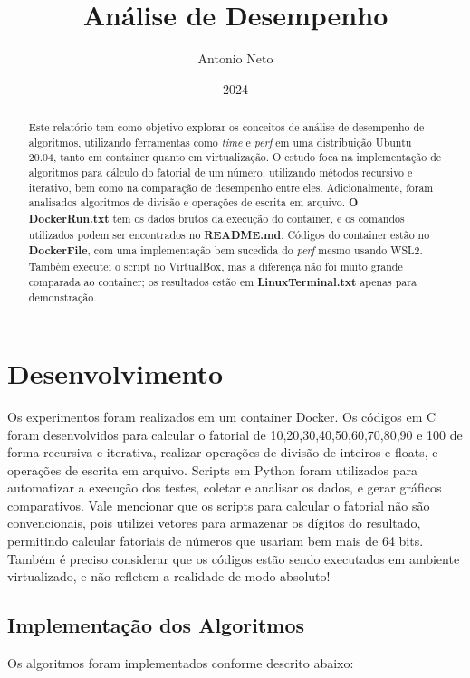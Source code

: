 \documentclass[12pt]{article}
\title{Análise de Desempenho}
\author{Antonio Neto}
\date{2024}
\begin{document}
\maketitle

\begin{abstract}
 Este relatório tem como objetivo explorar os conceitos de análise de desempenho de algoritmos, utilizando ferramentas como \textit{time} e \textit{perf} em uma distribuição Ubuntu 20.04, tanto em container quanto em virtualização. O estudo foca na implementação de algoritmos para cálculo do fatorial de um número, utilizando métodos recursivo e iterativo, bem como na comparação de desempenho entre eles. Adicionalmente, foram analisados algoritmos de divisão e operações de escrita em arquivo. \textbf{O DockerRun.txt} tem os dados brutos da execução do container, e os comandos utilizados podem ser encontrados no  \textbf{README.md}. Códigos do container estão no \textbf{DockerFile}, com uma implementação bem sucedida do \textit{perf} mesmo usando WSL2. Também executei o script no VirtualBox, mas a diferença não foi muito grande comparada ao container; os resultados estão em \textbf{LinuxTerminal.txt} apenas para demonstração.
\end{abstract}

\tableofcontents

\newpage

\section{Desenvolvimento}
Os experimentos foram realizados em um container Docker. Os códigos em C foram desenvolvidos para calcular o fatorial de 10,20,30,40,50,60,70,80,90 e 100 de forma recursiva e iterativa, realizar operações de divisão de inteiros e floats, e operações de escrita em arquivo. Scripts em Python foram utilizados para automatizar a execução dos testes, coletar e analisar os dados, e gerar gráficos comparativos. Vale mencionar que os scripts para calcular o fatorial não são convencionais, pois utilizei vetores para armazenar os dígitos do resultado, permitindo calcular fatoriais de números que usariam bem mais de 64 bits. Também é preciso considerar que os códigos estão sendo executados em ambiente virtualizado, e não refletem a realidade de modo absoluto!

\subsection{Implementação dos Algoritmos}
Os algoritmos foram implementados conforme descrito abaixo:
\end{document}

